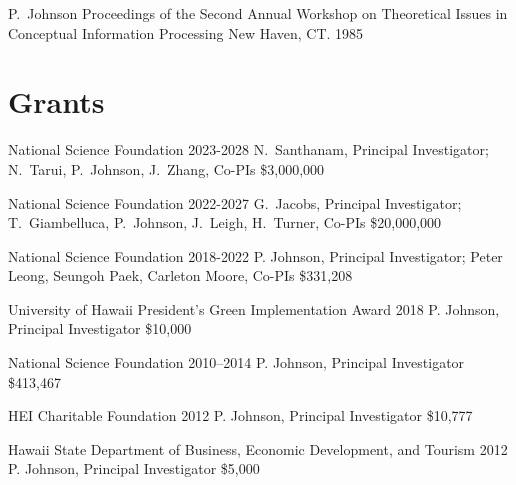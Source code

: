 \documentclass[11pt,letterpaper,sans]{moderncv} %
\begin{document}
          {P.~Johnson}
          {Proceedings of the Second Annual Workshop on Theoretical Issues in Conceptual Information Processing}
          {New Haven, CT.  1985}

\newpage
\section{Grants}

        {National Science Foundation} %
        {2023-2028} %
        {N.~Santhanam, Principal Investigator; N.~Tarui, P.~Johnson, J.~Zhang, Co-PIs}  %
        {\$3,000,000} %

        {National Science Foundation} %
        {2022-2027} %
        {G.~Jacobs, Principal Investigator; T.~Giambelluca, P.~Johnson, J.~Leigh, H.~Turner, Co-PIs}  %
        {\$20,000,000} %


        {National Science Foundation} %
        {2018-2022} %
        {P. Johnson, Principal Investigator; Peter Leong, Seungoh Paek, Carleton Moore, Co-PIs}  %
        {\$331,208} %

        {University of Hawaii President's Green Implementation Award} %
        {2018} %
        {P. Johnson, Principal Investigator}  %
        {\$10,000} %

        {National Science Foundation} %
        {2010--2014} %
        {P. Johnson, Principal Investigator}  %
        {\$413,467} %

            {HEI Charitable Foundation}
            {2012}
            {P. Johnson, Principal Investigator}
            {\$10,777}

            {Hawaii State Department of Business, Economic Development, and Tourism} %
            {2012} %
            {P. Johnson, Principal Investigator}  %
            {\$5,000} %
\end{document}
